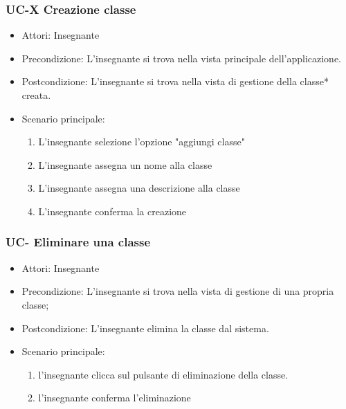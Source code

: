\subsubsection{UC-X Creazione classe}

\begin{itemize}
	\item Attori: Insegnante
	\item Precondizione: L'insegnante si trova nella vista principale dell'applicazione.
	\item Postcondizione: L'insegnante si trova nella vista di gestione della classe* creata.
	\item Scenario principale:
	\begin{enumerate}
		\item L'insegnante selezione l'opzione "aggiungi classe"
		\item L'insegnante assegna un nome alla classe
		\item L'insegnante assegna una descrizione alla classe
		\item L'insegnante conferma la creazione
	\end{enumerate}

\end{itemize}

\subsubsection{UC- Eliminare una classe}
\begin{itemize}
	\item Attori: Insegnante
	\item Precondizione: L'insegnante si trova nella vista di gestione di una propria classe;
	\item Postcondizione: L'insegnante elimina la classe dal sistema.
	\item Scenario principale:
	\begin{enumerate}
		\item l'insegnante clicca sul pulsante di eliminazione della classe.
		\item l'insegnante conferma l'eliminazione
	\end{enumerate}
\end{itemize}

